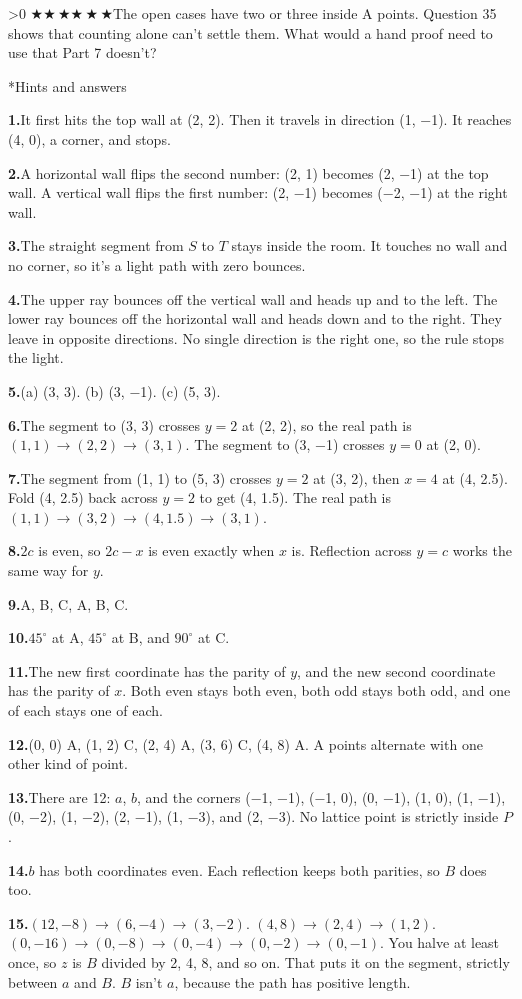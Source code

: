 \documentclass[11pt]{article}
\makeatletter
\renewcommand\section{\@startsection{section}{1}{\z@}{-1ex \@plus -.5ex}{1.4ex \@plus .2ex}{\sffamily\bfseries\LARGE\color{wall}}}
\newcommand\st{\ensuremath{\scriptstyle\bigstar}}
\newcommand\lvl[1]{{\color{amber}\ifcase#1\or\st\or\st\,\st\or\st\,\st\,\st\fi}\enspace}
\newcommand\qragged{}
\newenvironment{q}[2]{\par\addvspace{6pt}\noindent\begin{minipage}{\linewidth}\qragged
  \setlength\parskip{4pt}{\sffamily\bfseries\color{wall}#1}\enspace\ifnum#2>0 \lvl{#2}\fi}%
  {\end{minipage}\par}
\newcommand\work[1][0.38in]{\par\vspace{#1}\noindent{\color{rulecol}\leaders\hbox to 4pt{\hss.\hss}\hfill\kern0pt}\par}
\newcommand\ans[1]{\par\textbf{\color{wall}#1.}\enspace}
\makeatother
\begin{document}
\begin{q}{37}{0}The open cases have two or three inside A points. Question 35 shows that counting alone can't settle them. What would a hand proof need to use that Part 7 doesn't?\work\end{q}

\clearpage
\section*{Hints and answers}
\small
\ans{1}It first hits the top wall at (2, 2). Then it travels in direction (1, −1). It reaches (4, 0), a corner, and stops.
\ans{2}A horizontal wall flips the second number: (2, 1) becomes (2, −1) at the top wall. A vertical wall flips the first number: (2, −1) becomes (−2, −1) at the right wall.
\ans{3}The straight segment from $S$ to $T$ stays inside the room. It touches no wall and no corner, so it's a light path with zero bounces.
\ans{4}The upper ray bounces off the vertical wall and heads up and to the left. The lower ray bounces off the horizontal wall and heads down and to the right. They leave in opposite directions. No single direction is the right one, so the rule stops the light.
\ans{5}(a) (3, 3). (b) (3, −1). (c) (5, 3).
\ans{6}The segment to (3, 3) crosses $y = 2$ at (2, 2), so the real path is $(1, 1) \to (2, 2) \to (3, 1)$. The segment to (3, −1) crosses $y = 0$ at (2, 0).
\ans{7}The segment from (1, 1) to (5, 3) crosses $y = 2$ at (3, 2), then $x = 4$ at (4, 2.5). Fold (4, 2.5) back across $y = 2$ to get (4, 1.5). The real path is $(1, 1) \to (3, 2) \to (4, 1.5) \to (3, 1)$.
\ans{8}$2c$ is even, so $2c - x$ is even exactly when $x$ is. Reflection across $y = c$ works the same way for $y$.
\ans{9}A, B, C, A, B, C.
\ans{10}$45^\circ$ at A, $45^\circ$ at B, and $90^\circ$ at C.
\ans{11}The new first coordinate has the parity of $y$, and the new second coordinate has the parity of $x$. Both even stays both even, both odd stays both odd, and one of each stays one of each.
\ans{12}(0, 0) A, (1, 2) C, (2, 4) A, (3, 6) C, (4, 8) A. A points alternate with one other kind of point.
\ans{13}There are 12: $a$, $b$, and the corners (−1, −1), (−1, 0), (0, −1), (1, 0), (1, −1), (0, −2), (1, −2), (2, −1), (1, −3), and (2, −3). No lattice point is strictly inside $P$.
\ans{14}$b$ has both coordinates even. Each reflection keeps both parities, so $B$ does too.
\ans{15}$(12, -8) \to (6, -4) \to (3, -2)$. $(4, 8) \to (2, 4) \to (1, 2)$. $(0, -16) \to (0, -8) \to (0, -4) \to (0, -2) \to (0, -1)$. You halve at least once, so $z$ is $B$ divided by 2, 4, 8, and so on. That puts it on the segment, strictly between $a$ and $B$. $B$ isn't $a$, because the path has positive length.
\end{document}
